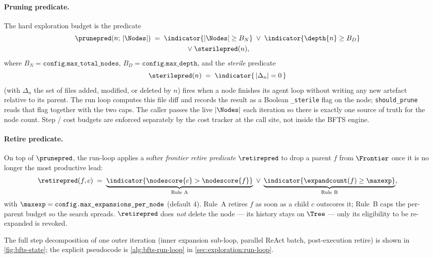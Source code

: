 \paragraph{Pruning predicate.}
The hard exploration budget is the predicate
\begin{multline}\label{eq:prune}
  \prunepred(n;\,|\Nodes|) \;=\;
    \indicator{|\Nodes| \geq B_N}
    \;\lor\;
    \indicator{\depth{n} \geq B_D}
    \\\;\lor\;
    \sterilepred(n),
\end{multline}
where $B_N = \texttt{config.max\_total\_nodes}$, $B_D =
\texttt{config.max\_depth}$, and the \emph{sterile} predicate
\begin{equation}\label{eq:sterile}
  \sterilepred(n) \;=\; \indicator{\,|\Delta_n| = 0\,}
\end{equation}
(with $\Delta_n$ the set of files added, modified, or deleted by $n$)
fires when a node finishes its agent loop without writing any new
artefact relative to its parent. The run loop computes this
file diff and records the result as a Boolean \texttt{\_sterile} flag
on the node; \texttt{should\_prune} reads that flag together with the
two caps. The caller passes the live $|\Nodes|$ each iteration so
there is exactly one source of truth for the node count.
Step / cost budgets are enforced separately by the cost tracker at
the call site, not inside the BFTS engine.

\paragraph{Retire predicate.}
On top of $\prunepred$, the run-loop applies a softer
\emph{frontier retire predicate} $\retirepred$ to drop a parent $f$
from $\Frontier$ once it is no longer the most productive lead:
\begin{equation}\label{eq:retire}
  \retirepred(f, c) \;=\;
    \underbrace{\indicator{\nodescore{c} > \nodescore{f}}}_{\text{Rule A}}
    \;\lor\;
    \underbrace{\indicator{\expandcount(f) \geq \maxexp}}_{\text{Rule B}},
\end{equation}
with $\maxexp = \texttt{config.max\_expansions\_per\_node}$ (default
$4$). Rule~A retires $f$ as soon as a child $c$ outscores it; Rule~B
caps the per-parent budget so the search spreads.
$\retirepred$ does \emph{not} delete the node — its history stays on
$\Tree$ — only its eligibility to be re-expanded is revoked.

The full step decomposition of one outer iteration (inner expansion
sub-loop, parallel ReAct batch, post-execution retire) is shown in
\cref{fig:bfts-state}; the explicit pseudocode is
\cref{alg:bfts-run-loop} in \cref{sec:exploration:run-loop}.

